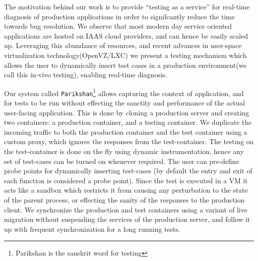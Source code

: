 The motivation behind our work is to provide ``testing as a service'' for real-time diagnosis of production applications in order to signifcantly reduce the time towards bug resolution.
We observe that most modern day service oriented applications are hosted on IAAS cloud providers, and can hence be easily scaled  up. 
Leveraging this abundance of resources, and recent advances in user-space virtualization technology(OpenVZ/LXC\cite{openvz,linux}) we present a testing mechanism which allows the user to dynamically insert test cases in a production environment(we call this in-vivo testing), enabling real-time diagnosis.

Our system called \texttt{Parikshan}\footnote{Parikshan is the sanskrit word for testing} allows capturing the context of application, and for tests to be run without effecting the sanctity and performance of the actual user-facing application. 
This is done by cloning a production server and creating two containers: a production container, and a testing container. 
We duplicate the incoming traffic to both the production container and the test container using a custom proxy, which ignores the responses from the test-container. 
The testing on the test-container is done on the fly using dynamic instrumentation, hence any set of test-cases can be turned on whenever required. 
The user can pre-define probe points for dynamically inserting test-cases (by default the entry and exit of each function is considered a probe point).
Since the test is executed in a VM it acts like a sandbox which restricts it from causing any perturbation to the state of the parent process, or effecting the sanity of the responses to the production client. 
We synchronize the production and test containers using a variant of live migration without suspending the services of the production server, and follow it up with frequent synchronization for a long running tests. 

